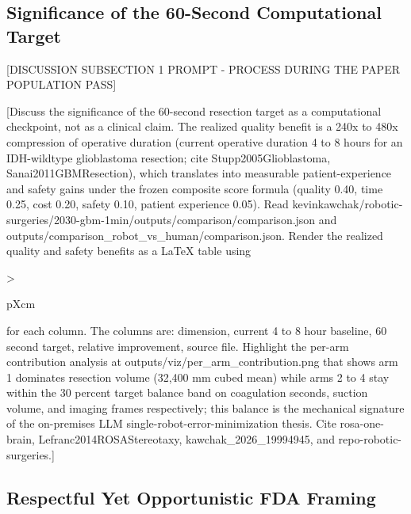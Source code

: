 
\subsection{Significance of the 60-Second Computational Target}
\label{sec:discussion-significance}

[DISCUSSION SUBSECTION 1 PROMPT - PROCESS DURING THE PAPER POPULATION PASS]

[Discuss the significance of the 60-second resection target as a
computational checkpoint, not as a clinical claim. The realized
quality benefit is a 240x to 480x compression of operative duration
(current operative duration 4 to 8 hours for an IDH-wildtype
glioblastoma resection; cite Stupp2005Glioblastoma, Sanai2011GBMResection),
which translates into measurable patient-experience and safety gains
under the frozen composite score formula (quality 0.40, time 0.25,
cost 0.20, safety 0.10, patient experience 0.05). Read
kevinkawchak/robotic-surgeries/2030-gbm-1min/outputs/comparison/comparison.json
and outputs/comparison_robot_vs_human/comparison.json. Render the
realized quality and safety benefits as a LaTeX table using
{>{\raggedright\arraybackslash}p{Xcm}} for each column. The columns
are: dimension, current 4 to 8 hour baseline, 60 second target,
relative improvement, source file. Highlight the per-arm
contribution analysis at outputs/viz/per_arm_contribution.png that
shows arm 1 dominates resection volume (32,400 mm cubed mean) while
arms 2 to 4 stay within the 30 percent target balance band on
coagulation seconds, suction volume, and imaging frames respectively;
this balance is the mechanical signature of the on-premises LLM
single-robot-error-minimization thesis. Cite rosa-one-brain,
Lefranc2014ROSAStereotaxy, kawchak_2026_19994945, and
repo-robotic-surgeries.]

\subsection{Respectful Yet Opportunistic FDA Framing}
\label{sec:discussion-fda}

